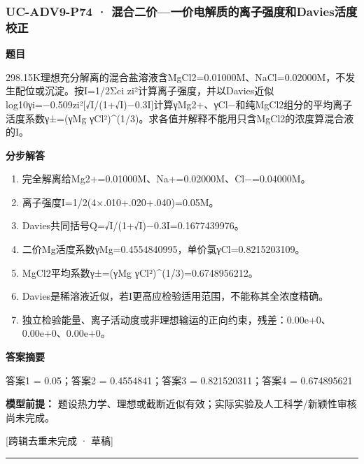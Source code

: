 \documentclass[UTF8,11pt,a4paper]{ctexart}
\begin{document}
\subsubsection*{UC-ADV9-P74 · 混合二价—一价电解质的离子强度和Davies活度校正}
\noindent\textbf{题目}\par
298.15K理想充分解离的混合盐溶液含MgCl2=0.01000M、NaCl=0.02000M，不发生配位或沉淀。按I=1/2Σci zi²计算离子强度，并以Davies近似log10γi=−0.509zi²[√I/(1+√I)−0.3I]计算γMg2+、γCl−和纯MgCl2组分的平均离子活度系数γ±=(γMg γCl²)\textasciicircum{}(1/3)。求各值并解释不能用只含MgCl2的浓度算混合液的I。\par
\medskip\noindent\textbf{分步解答}
\begin{enumerate}
\item 完全解离给Mg2+=0.01000M、Na+=0.02000M、Cl−=0.04000M。
\item 离子强度I=1/2(4×.010+.020+.040)=0.05M。
\item Davies共同括号Q=√I/(1+√I)−0.3I=0.1677439976。
\item 二价Mg活度系数γMg=0.4554840995，单价氯γCl=0.8215203109。
\item MgCl2平均系数γ±=(γMg γCl²)\textasciicircum{}(1/3)=0.6748956212。
\item Davies是稀溶液近似，若I更高应检验适用范围，不能称其全浓度精确。
\item 独立检验能量、离子活动度或非理想输运的正向约束，残差：0.00e+0、0.00e+0、0.00e+0。
\end{enumerate}
\noindent\textbf{答案摘要}\par
答案1 = 0.05；答案2 = 0.4554841；答案3 = 0.821520311；答案4 = 0.674895621\par
\noindent\textbf{模型前提：}
题设热力学、理想或截断近似有效；实际实验及人工科学/新颖性审核尚未完成。\par
\noindent\textcolor{red!65!black}{[跨辑去重未完成 · 草稿]} \par
\medskip\hrule\medskip
{}
\end{document}
